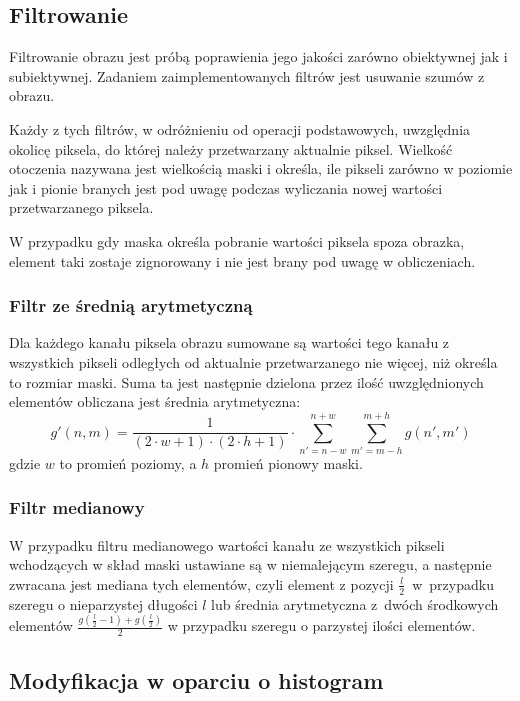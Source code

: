 \documentclass{classrep}
\begin{document}
\subsection{Filtrowanie}
Filtrowanie obrazu jest próbą poprawienia jego jakości \ppauza zarówno obiektywnej jak i subiektywnej. Zadaniem zaimplementowanych filtrów jest usuwanie szumów z obrazu.

Każdy z tych filtrów, w odróżnieniu od operacji podstawowych, uwzględnia okolicę piksela, do której należy przetwarzany aktualnie piksel. Wielkość otoczenia nazywana jest wielkością maski i określa, ile pikseli zarówno w poziomie jak i pionie branych jest pod uwagę podczas wyliczania nowej wartości przetwarzanego piksela.

W przypadku gdy maska określa pobranie wartości piksela spoza obrazka, element taki zostaje zignorowany i nie jest brany pod uwagę w obliczeniach.

\subsubsection{Filtr ze średnią arytmetyczną}
Dla każdego kanału piksela obrazu sumowane są wartości tego kanału z wszystkich pikseli odległych od aktualnie przetwarzanego nie więcej, niż określa to rozmiar maski. Suma ta jest następnie dzielona przez ilość uwzględnionych elementów \ppauza obliczana jest średnia arytmetyczna:
\begin{equation}
 g'(n, m) = \frac{1}{(2 \cdot w + 1) \cdot (2 \cdot h + 1)} \cdot \displaystyle \sum \limits_{n' = n - w}^{n + w} \displaystyle \sum \limits_{m' = m - h}^{m + h} g(n', m')
\end{equation}
gdzie $w$ to promień poziomy, a $h$ promień pionowy maski.

\subsubsection{Filtr medianowy}
W przypadku filtru medianowego wartości kanału ze wszystkich pikseli wchodzących w skład maski ustawiane są w niemalejącym szeregu, a następnie zwracana jest mediana tych elementów, czyli element z pozycji $\frac{l}{2}$~w~przypadku szeregu o nieparzystej długości $l$ lub średnia arytmetyczna z~dwóch środkowych elementów $\frac{g(\frac{l}{2} - 1) + g(\frac{l}{2})}{2}$ w przypadku szeregu o parzystej ilości elementów.

\subsection{Modyfikacja w oparciu o histogram}
\end{document}
